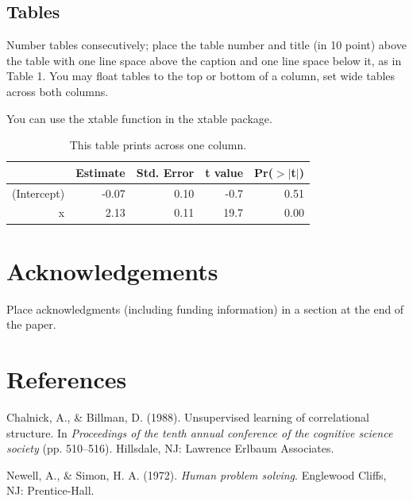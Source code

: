 \documentclass[10pt, letterpaper]{article}
\begin{document}
\subsection{Tables}\label{tables}

Number tables consecutively; place the table number and title (in 10
point) above the table with one line space above the caption and one
line space below it, as in Table 1. You may float tables to the top or
bottom of a column, set wide tables across both columns.

You can use the xtable function in the xtable package.

\begin{table}[H]
\centering
\begin{tabular}{rrrrr}
  \hline
 & Estimate & Std. Error & t value & Pr($>$$|$t$|$) \\ 
  \hline
(Intercept) & -0.07 & 0.10 & -0.7 & 0.51 \\ 
  x & 2.13 & 0.11 & 19.7 & 0.00 \\ 
   \hline
\end{tabular}
\caption{This table prints across one column.} 
\end{table}

\section{Acknowledgements}\label{acknowledgements}

Place acknowledgments (including funding information) in a section at
the end of the paper.

\section{References}\label{references}

\setlength{\parindent}{-0.1in} \setlength{\leftskip}{0.125in} \noindent

Chalnick, A., \& Billman, D. (1988). Unsupervised learning of
correlational structure. In \emph{Proceedings of the tenth annual
conference of the cognitive science society} (pp. 510--516). Hillsdale,
NJ: Lawrence Erlbaum Associates.

Newell, A., \& Simon, H. A. (1972). \emph{Human problem solving}.
Englewood Cliffs, NJ: Prentice-Hall.
\end{document}
